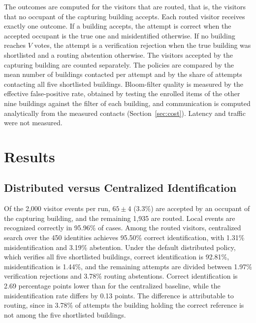 \documentclass[pdflatex,sn-mathphys-num]{sn-jnl}%
\theoremstyle{thmstyleone}%
\theoremstyle{thmstyletwo}%
\theoremstyle{thmstylethree}%
\begin{document}
The outcomes are computed for the visitors that are routed, that is, the visitors that no occupant of the capturing building accepts. Each routed visitor receives exactly one outcome. If a building accepts, the attempt is correct when the accepted occupant is the true one and misidentified otherwise. If no building reaches $V$ votes, the attempt is a verification rejection when the true building was shortlisted and a routing abstention otherwise. The visitors accepted by the capturing building are counted separately. The policies are compared by the mean number of buildings contacted per attempt and by the share of attempts contacting all five shortlisted buildings. Bloom-filter quality is measured by the effective false-positive rate, obtained by testing the enrolled items of the other nine buildings against the filter of each building, and communication is computed analytically from the measured contacts (Section~\ref{sec:cost}). Latency and traffic were not measured.


\section{Results}
\label{sec:results}

\subsection{Distributed versus Centralized Identification}

Of the 2,000 visitor events per run, $65\pm4$ (3.3\%) are accepted by an occupant of the capturing building, and the remaining 1,935 are routed. Local events are recognized correctly in 95.96\% of cases. Among the routed visitors, centralized search over the 450 identities achieves 95.50\% correct identification, with 1.31\% misidentification and 3.19\% abstention. Under the default distributed policy, which verifies all five shortlisted buildings, correct identification is 92.81\%, misidentification is 1.44\%, and the remaining attempts are divided between 1.97\% verification rejections and 3.78\% routing abstentions. Correct identification is 2.69 percentage points lower than for the centralized baseline, while the misidentification rate differs by 0.13 points. The difference is attributable to routing, since in 3.78\% of attempts the building holding the correct reference is not among the five shortlisted buildings.
\end{document}
